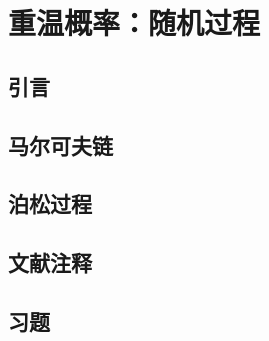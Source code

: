 \chapter{重温概率：随机过程}

\section{引言}

\pending

\section{马尔可夫链}

\pending

\section{泊松过程}

\pending

\section{文献注释}

\pending

\section{习题}

\pending
